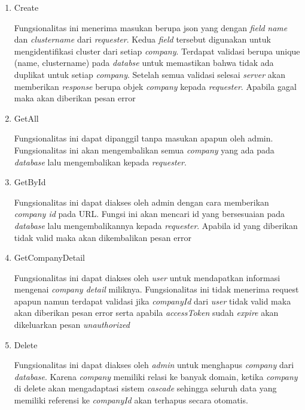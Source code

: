 \begin{enumerate}
  \item Create

        Fungsionalitas ini menerima masukan berupa json yang dengan \textit{field} \textit{name} dan \textit{cluster\textunderscore name} dari \textit{requester}. Kedua \textit{field} tersebut digunakan untuk mengidentifikasi cluster dari setiap \textit{company}. Terdapat validasi berupa unique (name, cluster\textunderscore name) pada \textit{databse} untuk memastikan bahwa tidak ada duplikat untuk setiap \textit{company}. Setelah semua validasi selesai \textit{server} akan memberikan \textit{response} berupa objek \textit{company} kepada \textit{requester}. Apabila gagal maka akan diberikan pesan error

  \item GetAll

        Fungsionalitas ini dapat dipanggil tanpa masukan apapun oleh admin. Fungsionalitas ini akan mengembalikan semua \textit{company} yang ada pada \textit{database} lalu mengembalikan kepada \textit{requester}.

  \item GetById

        Fungsionalitas ini dapat diakses oleh admin dengan cara memberikan \textit{company id} pada URL. Fungsi ini akan mencari id yang bersesuaian pada \textit{database} lalu mengembalikannya kepada \textit{requester}. Apabila id yang diberikan tidak valid maka akan dikembalikan pesan error

  \item GetCompanyDetail

        Fungsionalitas ini dapat diakses oleh \textit{user} untuk mendapatkan informasi mengenai \textit{company detail} miliknya. Fungsionalitas ini tidak menerima request apapun namun terdapat validasi jika \textit{companyId} dari \textit{user} tidak valid maka akan diberikan pesan error serta apabila \textit{accessToken} sudah \textit{expire} akan dikeluarkan pesan \textit{unauthorized}

  \item Delete

        Fungsionalitas ini dapat diakses oleh \textit{admin} untuk menghapus \textit{company} dari \textit{database}. Karena \textit{company} memiliki relasi ke banyak domain, ketika \textit{company} di delete akan mengadaptasi sistem \textit{cascade} sehingga seluruh data yang memiliki referensi ke \textit{companyId} akan terhapus secara otomatis.

\end{enumerate}


